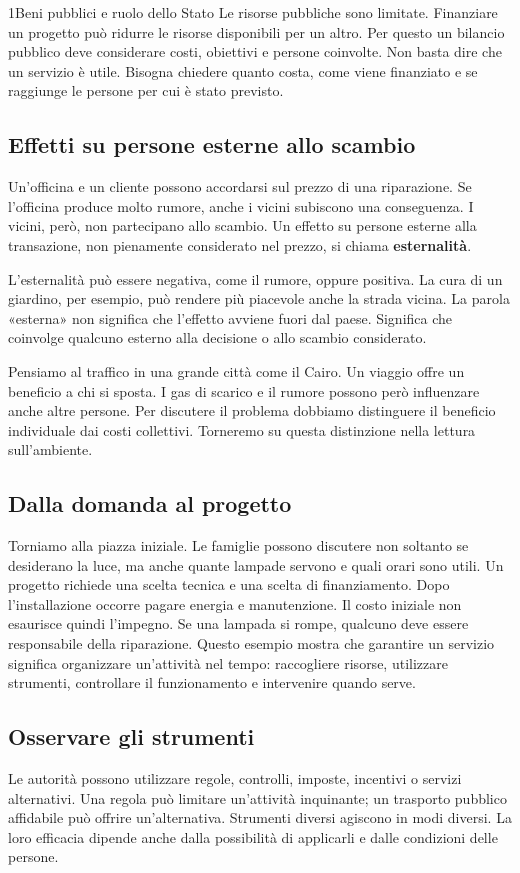 \begin{lettura}{1}{Beni pubblici e ruolo dello Stato}
Le risorse pubbliche sono limitate. Finanziare un progetto può ridurre le risorse disponibili per un altro. Per questo un bilancio pubblico deve considerare costi, obiettivi e persone coinvolte. Non basta dire che un servizio è utile. Bisogna chiedere quanto costa, come viene finanziato e se raggiunge le persone per cui è stato previsto.

\subsection*{Effetti su persone esterne allo scambio}
Un'officina e un cliente possono accordarsi sul prezzo di una riparazione. Se l'officina produce molto rumore, anche i vicini subiscono una conseguenza. I vicini, però, non partecipano allo scambio. Un effetto su persone esterne alla transazione, non pienamente considerato nel prezzo, si chiama \textbf{esternalità}.

L'esternalità può essere negativa, come il rumore, oppure positiva. La cura di un giardino, per esempio, può rendere più piacevole anche la strada vicina. La parola «esterna» non significa che l'effetto avviene fuori dal paese. Significa che coinvolge qualcuno esterno alla decisione o allo scambio considerato.

Pensiamo al traffico in una grande città come il Cairo. Un viaggio offre un beneficio a chi si sposta. I gas di scarico e il rumore possono però influenzare anche altre persone. Per discutere il problema dobbiamo distinguere il beneficio individuale dai costi collettivi. Torneremo su questa distinzione nella lettura sull'ambiente.

\subsection*{Dalla domanda al progetto}
Torniamo alla piazza iniziale. Le famiglie possono discutere non soltanto se desiderano la luce, ma anche quante lampade servono e quali orari sono utili. Un progetto richiede una scelta tecnica e una scelta di finanziamento. Dopo l'installazione occorre pagare energia e manutenzione. Il costo iniziale non esaurisce quindi l'impegno. Se una lampada si rompe, qualcuno deve essere responsabile della riparazione. Questo esempio mostra che garantire un servizio significa organizzare un'attività nel tempo: raccogliere risorse, utilizzare strumenti, controllare il funzionamento e intervenire quando serve.

\subsection*{Osservare gli strumenti}
Le autorità possono utilizzare regole, controlli, imposte, incentivi o servizi alternativi. Una regola può limitare un'attività inquinante; un trasporto pubblico affidabile può offrire un'alternativa. Strumenti diversi agiscono in modi diversi. La loro efficacia dipende anche dalla possibilità di applicarli e dalle condizioni delle persone.


\end{lettura}
